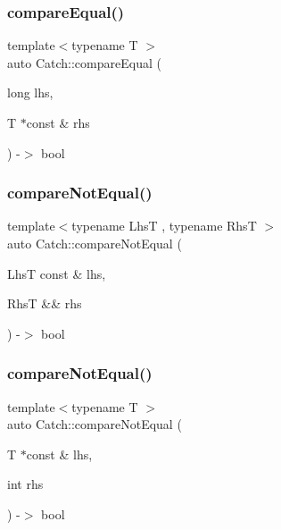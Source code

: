 \mbox{\label{namespace_catch_a72f10ec2cad6db16029d48c8c1d9df2f}} 
\subsubsection{compareEqual()\hspace{0.1cm}{\footnotesize\ttfamily [5/5]}}
{\footnotesize\ttfamily template$<$typename T $>$ \\
auto Catch\+::compare\+Equal (\begin{DoxyParamCaption}\item[{long}]{lhs,  }\item[{T $\ast$const \&}]{rhs }\end{DoxyParamCaption}) -\/$>$ bool }

\mbox{\label{namespace_catch_a8bec217f5ef5f09c17074c311c958f3c}} 
\subsubsection{compareNotEqual()\hspace{0.1cm}{\footnotesize\ttfamily [1/5]}}
{\footnotesize\ttfamily template$<$typename LhsT , typename RhsT $>$ \\
auto Catch\+::compare\+Not\+Equal (\begin{DoxyParamCaption}\item[{LhsT const \&}]{lhs,  }\item[{RhsT \&\&}]{rhs }\end{DoxyParamCaption}) -\/$>$ bool }

\mbox{\label{namespace_catch_aa81c95898f22dce1f61d7710e495d1ee}} 
\subsubsection{compareNotEqual()\hspace{0.1cm}{\footnotesize\ttfamily [2/5]}}
{\footnotesize\ttfamily template$<$typename T $>$ \\
auto Catch\+::compare\+Not\+Equal (\begin{DoxyParamCaption}\item[{T $\ast$const \&}]{lhs,  }\item[{int}]{rhs }\end{DoxyParamCaption}) -\/$>$ bool }

